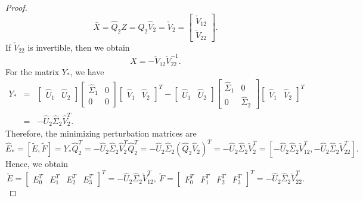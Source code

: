 \documentclass[preprint,11pt,3p]{elsarticle}
\begin{document}
\begin{proof}
$$\bar{X} = \hat{Q}_2Z=\hat{Q}_2\hat{V}_2=\check{V}_2=\begin{bmatrix}
		\check{V}_{12} \\
		\check{V}_{22}
	\end{bmatrix}.$$
	If $\check{V}_{22}$ is invertible, then we obtain
	\begin{equation*}
		X=-\check{V}_{12}\check{V}_{22}^{-1}.
	\end{equation*}
	For the matrix $Y_{*}$, we have
	\begin{eqnarray*}
		Y_{*} &=& \begin{bmatrix}
			\hat{U}_1 & \hat{U}_2
		\end{bmatrix}\begin{bmatrix}
			\hat{\Sigma}_1 & 0\\
			0 & 0
		\end{bmatrix}\begin{bmatrix}
			\hat{V}_1 & \hat{V}_2
		\end{bmatrix}^T - \begin{bmatrix}
			\hat{U}_1 & \hat{U}_2
		\end{bmatrix}\begin{bmatrix}
			\hat{\Sigma}_1 & 0\\
			0 & \hat{\Sigma}_2
		\end{bmatrix}\begin{bmatrix}
			\hat{V}_1 & \hat{V}_2
		\end{bmatrix}^T \\
		& =& -\hat{U}_2 \hat{\Sigma}_2 \hat{V}_2^T.
	\end{eqnarray*} 
Therefore, the minimizing perturbation matrices are
	\begin{equation*}
		\hat{E}_{*} =[\widetilde{E}, \widetilde{F}]=Y_*\hat{Q}_2^T=-\hat{U}_2 \hat{\Sigma}_2 \hat{V}_2^T \hat{Q}_2^T = -\hat{U}_2 \hat{\Sigma}_2(\hat{Q}_2 \hat{V}_2)^T = -\hat{U}_2 \hat{\Sigma}_2 \check{V}_2^T = [-\hat{U}_2 \hat{\Sigma}_2 \check{V}_{12}^T, -\hat{U}_2 \hat{\Sigma}_2 \check{V}_{22}^T].
	\end{equation*}
	Hence, we obtain
	\begin{equation*}
		\widetilde{E} = \begin{bmatrix} E_0^T & E_1^T & E_2^T & E_3^T \end{bmatrix}^T= -\hat{U}_2 \hat{\Sigma}_2 \check{V}_{12}^T, ~  \widetilde{F} = \begin{bmatrix} F_0^T & F_1^T & F_2^T & F_3^T \end{bmatrix}^T= -\hat{U}_2 \hat{\Sigma}_2 \check{V}_{22}^T.
	\end{equation*}
\end{proof}
\end{document}
